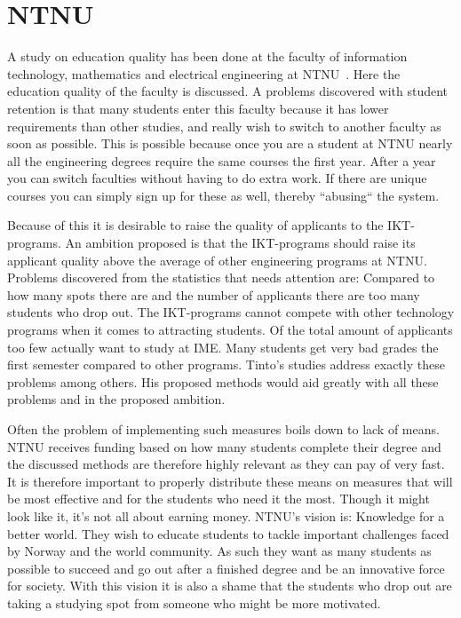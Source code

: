 \section{NTNU}
A study on education quality has been done at the faculty of information technology, mathematics and electrical engineering at NTNU~\cite{ntnu:dropout}. 
Here the education quality of the faculty is discussed. 
A problems discovered with student retention is that many students enter this faculty because it has lower requirements than other studies, and really wish to switch to another faculty as soon as possible. 
This is possible because once you are a student at NTNU nearly all the engineering degrees require the same courses the first year. 
After a year you can switch faculties without having to do extra work. 
If there are unique courses you can simply sign up for these as well, thereby ``abusing`` the system.

\bigskip\noindent
Because of this it is desirable to raise the quality of applicants to the IKT-programs. 
An ambition proposed is that the IKT-programs should raise its applicant quality above the average of other engineering programs at NTNU.
Problems discovered from the statistics that needs attention are:
Compared to how many spots there are and the number of applicants there are too many students who drop out. 
The IKT-programs cannot compete with other technology programs when it comes to attracting students. 
Of the total amount of applicants too few actually want to study at IME.
Many students get very bad grades the first semester compared to other programs.
Tinto's studies address exactly these problems among others. His proposed methods would aid greatly with all these problems and in the proposed ambition.

\bigskip\noindent
Often the problem of implementing such measures boils down to lack of means.
NTNU receives funding based on how many students complete their degree and the discussed methods are therefore highly relevant as they can pay of very fast.
It is therefore important to properly distribute these means on measures that will be most effective and for the students who need it the most.
Though it might look like it, it's not all about earning money.
NTNU's vision is: Knowledge for a better world.
They wish to educate students to tackle important challenges faced by Norway and the world community.
As such they want as many students as possible to succeed and go out after a finished degree and be an innovative force for society. 
With this vision it is also a shame that the students who drop out are taking a studying spot from someone who might be more motivated.

